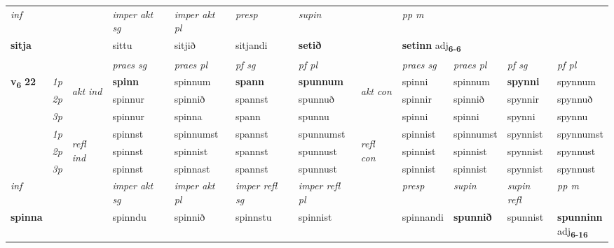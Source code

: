\begin{longtable}[l]{X>{\footnotesize\itshape}llXXXXlXXXX}
   {\textit{inf}} & &  & \textit{imper akt sg} & \textit{imper akt pl}   & \textit{presp} & \textit{supin}  && \textit{pp m} \\*
  {\textbf{sitja}} & && sittu  & sitjið   & sitjandi &  \textbf{setið}  && \multicolumn{2}{l}{\textbf{setinn} adj\textbf{\textsubscript{6-6}}} \\*

\midrule

 & &   & \textit{praes sg}  & \textit{praes pl}    & \textit{ pf sg} & \textit{pf pl} & & \textit{praes sg}  & \textit{praes pl}    & \textit{pf sg} & \textit{pf pl }  \\ \cmidrule{4-7} \cmidrule{9-12}
 \multirow{2}{*}{{{\textbf{v{\textsubscript{6}}} \Large{\textbf{22}}}}}  & 1p & \multirow{3}{*}{\begin{turn}{90}\textit{akt ind}\end{turn}} & \textbf{spinn} & spinnum & \textbf{spann} & \textbf{spunnum} & \multirow{3}{*}{\begin{turn}{90}\textit{akt con}\end{turn}} &spinni & spinnum & \textbf{spynni} & spynnum\\*
 & 2p &  &  spinnur  & spinnið & spannst & spunnuð & & spinnir & spinnið & spynnir & spynnuð \\*
 & 3p &  & spinnur & spinna & spann & spunnu & & spinni & spinni& spynni & spynnu \\*
\cmidrule{4-7} \cmidrule{9-12}
 & 1p & \multirow{3}{*}{\begin{turn}{90}\textit{refl ind}\end{turn}}  & spinnst & spinnumst & spannst & spunnumst & \multirow{3}{*}{\begin{turn}{90}\textit{refl con}\end{turn}}  &spinnist & spinnumst & spynnist & spynnumst \\*
 & 2p &  & spinnst & spinnist & spannst & spunnust & &spinnist & spinnist & spynnist & spynnust \\*
 & 3p  & & spinnst & spinnast & spannst & spunnust & & spinnist & spinnist& spynnist & spynnust \\*
\cmidrule{4-7} \cmidrule{9-12}

   {\textit{inf}} & &  & \textit{imper akt sg} & \textit{imper akt pl} & \textit{imper refl sg} & \textit{imper refl pl} && \textit{presp} & \textit{supin} & \textit{supin refl} & \textit{pp m} \\*
  {\textbf{spinna}} & && spinndu  & spinnið & spinnstu & spinnist && spinnandi &  \textbf{spunnið} & spunnist & \specialcell{\textbf{spunninn} \\ adj\textbf{\textsubscript{6-16}}} \\*


\end{longtable}
